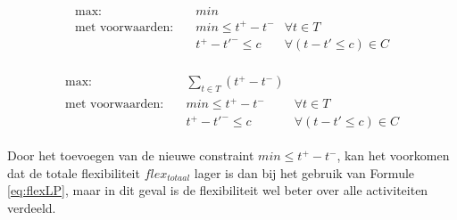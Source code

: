 \begin{align}
\label{eq:flexfirstLP}
\begin{aligned}
        \text{max:}& \quad min & \\
 \text{met voorwaarden:}& \quad min \leq t^+ - t^- & \forall t \in T \\
                   & \quad t^+ - t'^- \leq c & \forall (t - t' \leq c) \in C
\end{aligned}
\end{align}

\begin{align}
\label{eq:flexsecondLP}
\begin{aligned}
        \text{max:}& \quad \sum_{t \in T} (t^+ - t^-) & \\
 \text{met voorwaarden:}& \quad min \leq t^+ - t^- & \forall t \in T \\
                   & \quad t^+ - t'^- \leq c & \forall (t - t' \leq c) \in C
\end{aligned}
\end{align}

Door het toevoegen van de nieuwe constraint $min \leq t^+ - t^-$, kan het voorkomen dat de totale flexibiliteit $flex_{totaal}$ lager is dan bij het gebruik van Formule \ref{eq:flexLP}, maar in dit geval is de flexibiliteit wel beter over alle activiteiten verdeeld.
